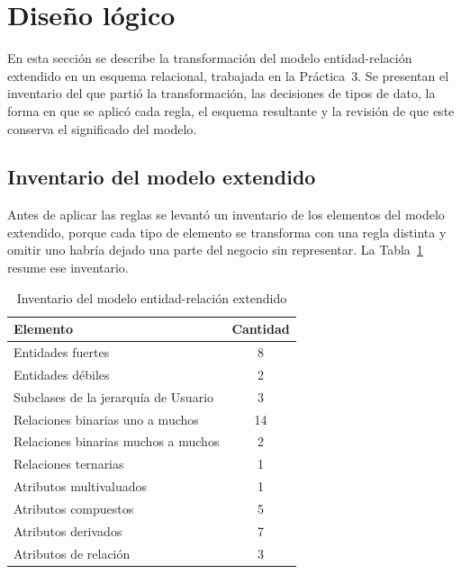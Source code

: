 \newpage

\section{Diseño lógico}
\label{sec:diseno-logico}

En esta sección se describe la transformación del modelo entidad-relación extendido en un esquema relacional, trabajada en la Práctica~3. Se presentan el inventario del que partió la transformación, las decisiones de tipos de dato, la forma en que se aplicó cada regla, el esquema resultante y la revisión de que este conserva el significado del modelo.

\subsection{Inventario del modelo extendido}

Antes de aplicar las reglas se levantó un inventario de los elementos del modelo extendido, porque cada tipo de elemento se transforma con una regla distinta y omitir uno habría dejado una parte del negocio sin representar. La Tabla~\ref{tab:inventario} resume ese inventario.

\begin{table}[H]
    \centering
    \small
    \begin{tabular}{lc}
        \toprule
        \textbf{Elemento} & \textbf{Cantidad} \\
        \midrule
        Entidades fuertes & 8 \\
        Entidades débiles & 2 \\
        Subclases de la jerarquía de Usuario & 3 \\
        Relaciones binarias uno a muchos & 14 \\
        Relaciones binarias muchos a muchos & 2 \\
        Relaciones ternarias & 1 \\
        Atributos multivaluados & 1 \\
        Atributos compuestos & 5 \\
        Atributos derivados & 7 \\
        Atributos de relación & 3 \\
        \bottomrule
    \end{tabular}
    \captionsetup{labelfont=bf, textfont=it, labelsep=newline, justification=raggedright, singlelinecheck=false}
    \caption{Inventario del modelo entidad-relación extendido}
    \label{tab:inventario}
\end{table}

